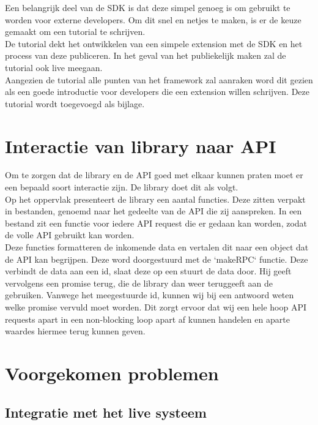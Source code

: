 Een belangrijk deel van de SDK is dat deze simpel genoeg is om gebruikt te worden voor externe developers. Om dit snel en netjes te maken, is er de keuze gemaakt om een tutorial te schrijven. \\

De tutorial dekt het ontwikkelen van een simpele extension met de SDK en het process van deze publiceren. In het geval van het publiekelijk maken zal de tutorial ook live meegaan. \\

Aangezien de tutorial alle punten van het framework zal aanraken word dit gezien als een goede introductie voor developers die een extension willen schrijven. Deze tutorial wordt toegevoegd als bijlage. \\

\section{Interactie van library naar API}

Om te zorgen dat de library en de API goed met elkaar kunnen praten moet er een bepaald soort interactie zijn. De library doet dit als volgt. \\

Op het oppervlak presenteert de library een aantal functies. Deze zitten verpakt in bestanden, genoemd naar het gedeelte van de API die zij aanspreken. In een bestand zit een functie voor iedere API request die er gedaan kan worden, zodat de volle API gebruikt kan worden. \\ 

Deze functies formatteren de inkomende data en vertalen dit naar een object dat de API kan begrijpen. Deze word doorgestuurd met de `makeRPC` functie. Deze verbindt de data aan een id, slaat deze op een stuurt de data door. Hij geeft vervolgens een promise terug, die de library dan weer teruggeeft aan de gebruiken. Vanwege het meegestuurde id, kunnen wij bij een antwoord weten welke promise vervuld moet worden. Dit zorgt ervoor dat wij een hele hoop API requests apart in een non-blocking loop apart af kunnen handelen en aparte waardes hiermee terug kunnen geven. \\

\section{Voorgekomen problemen}

\subsection{Integratie met het live systeem}

